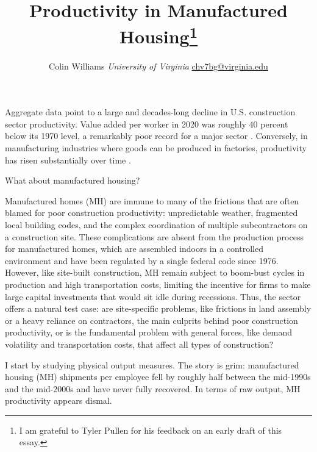 \documentclass[11pt,article,oneside]{memoir}
\title{\bigskip \bigskip Productivity in Manufactured Housing\thanks{I
am grateful to Tyler Pullen for his feedback on an early draft of this
essay.}  }
\author{\Large Colin
Williams\vspace{0.05in} \newline\normalsize\emph{University of
Virginia} \newline\footnotesize \protect\url{chv7bg@virginia.edu}\vspace*{0.2in}\newline }
\date{}
\begin{document}
  
\pagestyle{kjh}


\maketitle



Aggregate data point to a large and decades-long decline in U.S.
construction sector productivity. Value added per worker in 2020 was
roughly 40 percent below its 1970 level, a remarkably poor record for a
major sector \citep{goolsbee_strange_2023}. Conversely, in manufacturing
industries where goods can be produced in factories, productivity has
risen substantially over time \citep{potter_origins_2025}.

What about manufactured housing?

Manufactured homes (MH) are immune to many of the frictions that are
often blamed for poor construction productivity: unpredictable weather,
fragmented local building codes, and the complex coordination of
multiple subcontractors on a construction site. These complications are
absent from the production process for manufactured homes, which are
assembled indoors in a controlled environment and have been regulated by
a single federal code since 1976. However, like site-built construction,
MH remain subject to boom-bust cycles in production and high
transportation costs, limiting the incentive for firms to make large
capital investments that would sit idle during recessions. Thus, the
sector offers a natural test case: are site-specific problems, like
frictions in land assembly or a heavy reliance on contractors, the main
culprits behind poor construction productivity, or is the fundamental
problem with general forces, like demand volatility and transportation
costs, that affect all types of construction?

I start by studying physical output measures. The story is grim:
manufactured housing (MH) shipments per employee fell by roughly half
between the mid-1990s and the mid-2000s and have never fully recovered.
In terms of raw output, MH productivity appears dismal.
\end{document}
